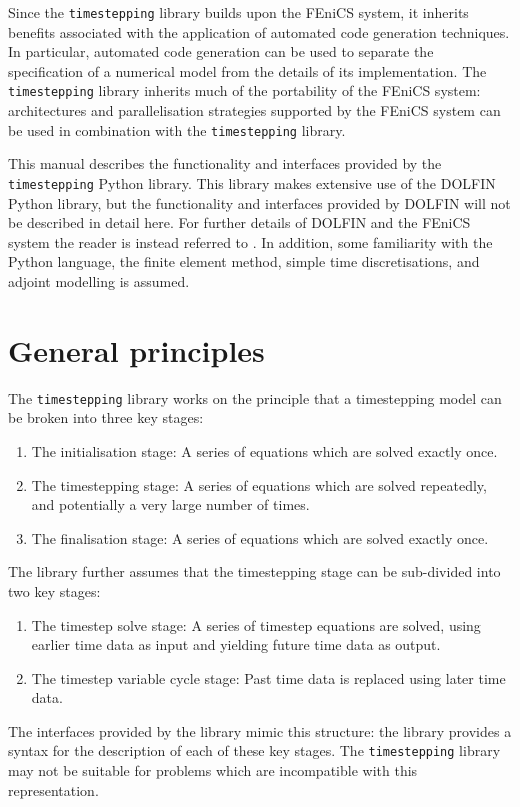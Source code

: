 \documentclass[a4paper]{book}
\begin{document}
Since the \verb+timestepping+ library builds upon the FEniCS system, it inherits
benefits associated with the application of automated code generation
techniques. In particular, automated code generation can be used to separate the
specification of a numerical model from the details of its implementation. The
\verb+timestepping+ library inherits much of the portability of the FEniCS
system: architectures and parallelisation strategies supported by the FEniCS
system can be used in combination with the \verb+timestepping+ library.

This manual describes the functionality and interfaces provided by the
\linebreak \verb+timestepping+ Python library. This library makes extensive use
of the DOLFIN Python library, but the functionality and interfaces provided by
DOLFIN will not be described in detail here. For further details of DOLFIN and
the FEniCS system the reader is instead referred to \citet{logg2012}. In
addition, some familiarity with the Python language, the finite element method,
simple time discretisations, and adjoint modelling is assumed.

\section{General principles}\label{sect:principles}

The \verb+timestepping+ library works on the principle that a timestepping
model can be broken into three key stages:
\begin{enumerate}
  \item The initialisation stage: A series of equations which are solved
        exactly once.
  \item The timestepping stage: A series of equations which are solved
        repeatedly, and potentially a very large number of times.
  \item The finalisation stage: A series of equations which are solved
        exactly once.
\end{enumerate}
The library further assumes that the timestepping stage can be sub-divided into
two key stages:
\begin{enumerate}
  \item The timestep solve stage: A series of timestep equations are solved,
        using earlier time data as input and yielding future time data as
        output.
  \item The timestep variable cycle stage: Past time data is replaced using
        later time data.
\end{enumerate}
The interfaces provided by the library mimic this structure: the library
provides a syntax for the description of each of these key stages. The
\verb+timestepping+ library may not be suitable for problems which are
incompatible with this representation.
\end{document}
